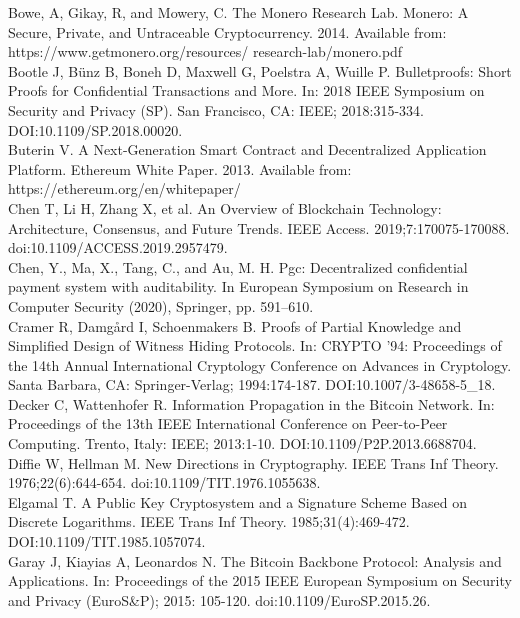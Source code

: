 \documentclass[10pt,a4paper,twocolumn]{article}
\begin{document}
Bowe, A, Gikay, R, and Mowery, C. The Monero Research Lab. Monero: A Secure, Private, and Untraceable Cryptocurrency. 2014. Available from: https://www.getmonero.org/resources/ research-lab/monero.pdf \\

Bootle J, Bünz B, Boneh D, Maxwell G, Poelstra A, Wuille P. Bulletproofs: Short Proofs for Confidential Transactions and More. In: 2018 IEEE Symposium on Security and Privacy (SP). San Francisco, CA: IEEE; 2018:315-334. DOI:10.1109/SP.2018.00020.\\

Buterin V. A Next-Generation Smart Contract and Decentralized Application Platform. Ethereum White Paper. 2013. Available from: https://ethereum.org/en/whitepaper/\\

Chen T, Li H, Zhang X, et al. An Overview of Blockchain Technology: Architecture, Consensus, and Future Trends. IEEE Access. 2019;7:170075-170088. doi:10.1109/ACCESS.2019.2957479.\\

Chen, Y., Ma, X., Tang, C., and Au, M. H. Pgc: Decentralized confidential payment system with auditability. In European Symposium on Research in Computer Security (2020), Springer, pp. 591–610.\\

Cramer R, Damgård I, Schoenmakers B. Proofs of Partial Knowledge and Simplified Design of Witness Hiding Protocols. In: CRYPTO '94: Proceedings of the 14th Annual International Cryptology Conference on Advances in Cryptology. Santa Barbara, CA: Springer-Verlag; 1994:174-187. DOI:10.1007/3-48658-5\_18.\\

Decker C, Wattenhofer R. Information Propagation in the Bitcoin Network. In: Proceedings of the 13th IEEE International Conference on Peer-to-Peer Computing. Trento, Italy: IEEE; 2013:1-10. DOI:10.1109/P2P.2013.6688704.\\

Diffie W, Hellman M. New Directions in Cryptography. IEEE Trans Inf Theory. 1976;22(6):644-654. doi:10.1109/TIT.1976.1055638.\\

Elgamal T. A Public Key Cryptosystem and a Signature Scheme Based on Discrete Logarithms. IEEE Trans Inf Theory. 1985;31(4):469-472. DOI:10.1109/TIT.1985.1057074.\\

Garay J, Kiayias A, Leonardos N. The Bitcoin Backbone Protocol: Analysis and Applications. In: Proceedings of the 2015 IEEE European Symposium on Security and Privacy (EuroS\&P); 2015: 105-120. doi:10.1109/EuroSP.2015.26.\\
\end{document}
